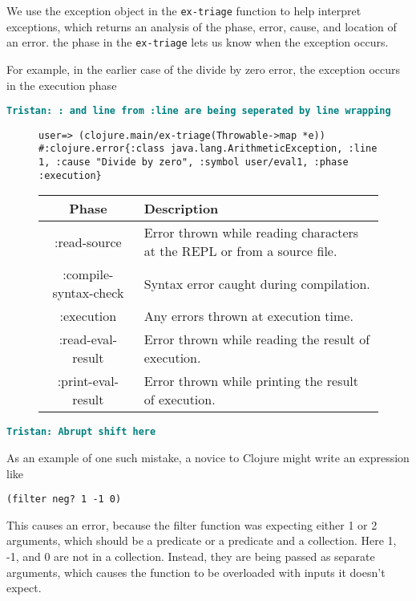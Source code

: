 \documentclass[12pt]{article}
\newcommand{\comment}[1]{{\bf \tt  {#1}}}
\newcommand{\tkcomment}[1]{\textcolor{Teal}{\comment{Tristan: {#1}}}}
\begin{document}
	We use the exception object in the \texttt{ex-triage} function to help interpret exceptions, which returns an analysis of the phase, error, cause, and location of an error.
	 the phase in the \texttt{ex-triage} lets us know when the exception occurs.
	
	For example, in the earlier case of the divide by zero error, the exception occurs in the execution phase

	\tkcomment{: and line from :line are being seperated by line wrapping}

	\begin{figure}[h]
		\centering
		\begin{lstlisting}[breaklines=true, basicstyle=\ttfamily]
user=> (clojure.main/ex-triage(Throwable->map *e))
#:clojure.error{:class java.lang.ArithmeticException, :line 1, :cause "Divide by zero", :symbol user/eval1, :phase :execution}
		\end{lstlisting}
	\end{figure}

	\begin{figure}[h]
		\centering
		\begin{tabular}{|c|l|}
			\hline
			\textbf{Phase} & \textbf{Description} \\
			\hline
			:read-source & Error thrown while reading characters at the REPL or from a source file. \\
			:compile-syntax-check & Syntax error caught during compilation. \\
			:execution & Any errors thrown at execution time. \\
			:read-eval-result & Error thrown while reading the result of execution. \\
			:print-eval-result & Error thrown while printing the result of execution. \\
			\hline
		\end{tabular}
	\end{figure}

\tkcomment{Abrupt shift here}

As an example of one such mistake, a novice to Clojure might write an expression like
\begin{verbatim}
(filter neg? 1 -1 0)
\end{verbatim}

This causes an error, because the filter function was expecting either 1 or 2 arguments,
 which should be a predicate or a predicate and a collection. Here 1, -1, and 0 are not in a collection. 
 Instead, they are being passed as separate arguments, which causes the function to be overloaded with inputs it doesn’t expect.
\end{document}
